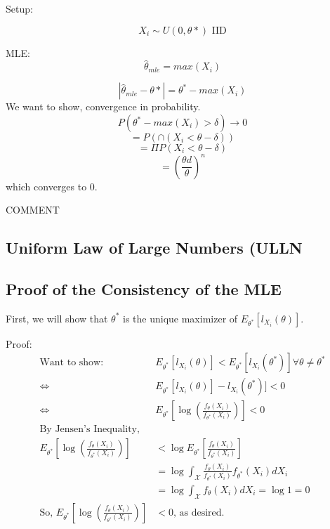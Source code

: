 \documentclass[aos,preprint]{imsart}
\numberwithin{equation}{section}
\theoremstyle{plain}
\begin{document}
Setup: 

$$ X_i \sim U(0,\theta*) \text{ IID}$$

MLE: 
$$ \hat \theta_{mle} = max(X_i) $$

$$ |\hat \theta_{mle} - \theta* | = \theta^* - max(X_i) $$
We want to show, convergence in probability. 
$$ P( \theta^* - max(X_i) >\delta) \rightarrow 0 $$
$$ = P( \cap ( X_i < \theta - \delta)) $$
$$ = \Pi P(  X_i < \theta - \delta) $$
$$ =  (\frac{\theta d}{\theta})^n$$ which converges to 0. 

COMMENT 


\subsection{Uniform Law of Large Numbers (ULLN}



\subsection{Proof of the Consistency of the MLE}

First, we will show that $\theta^*$ is the unique maximizer of $E_{\theta^*} [l_{X_i} (\theta)]$.

Proof:
\begin{align}
	\text{Want to show: } & E_{\theta^*} [l_{X_i} (\theta)] < E_{\theta^*} [l_{X_i} (\theta^*)] \forall \theta \neq \theta^* \\
	\iff & E_{\theta^*} [l_{X_i} (\theta)] - l_{X_i} (\theta^*)] < 0 \\
	\iff & E_{\theta^*} [\log (\frac{f_\theta (X_i)}{f_{\theta^*} (X_i)})] < 0 \\
	\text{By Jensen's Inequality, } \\
	E_{\theta^*} [\log (\frac{f_\theta (X_i)}{f_{\theta^*} (X_i)})] & < \log E_{\theta^*} [\frac{f_\theta (X_i)}{f_{\theta^*} (X_i)}] \\
	& = \log \int_{\mathcal{X}}^{} \frac{f_\theta (X_i)}{f_{\theta^*} (X_i)} f_{\theta^*} (X_i) dX_i 
	\\ & = \log \int_{\mathcal{X}}^{} f_\theta (X_i) dX_i = \log 1 = 0 \\
	\text{So, } E_{\theta^*} [\log (\frac{f_\theta (X_i)}{f_{\theta^*} (X_i)})] & < 0 \text{, as desired.}
\end{align}
\end{document}

